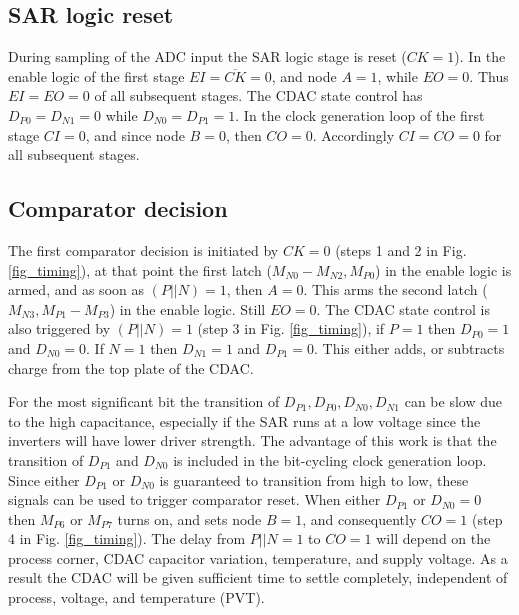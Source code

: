 \subsection{SAR logic reset}
During sampling of the ADC input the SAR logic stage is reset ($CK=1$). In the
enable logic of the first  stage $EI=\overline{CK}=0$, and node $A=1$,
while $EO=0$. Thus $EI=EO=0$ of all subsequent stages. The CDAC
state control has $D_{P0}=D_{N1}=0$ while $D_{N0}=D_{P1}=1$. In the clock generation
loop of the first stage $CI=0$, and since node $B=0$, then
$CO=0$. Accordingly $CI=CO=0$ for all subsequent stages.

\subsection{Comparator decision}
The first comparator decision is initiated by $CK=0$ (steps 1 and 2 in Fig. \ref{fig_timing}), at that point the
first latch ($M_{N0}-M_{N2}, M_{P0}$) in the enable logic is armed, and as soon as $(P||N)=1$,
then $A=0$. This arms the second latch ($M_{N3},M_{P1}-M_{P3}$) in the enable
logic. Still $EO=0$. 
The CDAC state control is also triggered by $(P||N)=1$ (step 3 in Fig. \ref{fig_timing}), if $P=1$ then $D_{P0}=1$
and $D_{N0}=0$. If $N=1$ then $D_{N1}=1$ and $D_{P1}=0$. This
either adds, or subtracts charge from the top plate of the
CDAC. 


For the most significant bit the transition of $D_{P1},D_{P0},D_{N0},D_{N1}$ can be slow due to the
high capacitance, especially if the SAR runs at
a low voltage since the inverters will have lower driver strength. 
The advantage of this work is that the transition of $D_{P1}$ and $D_{N0}$ is included in the bit-cycling
clock generation loop. Since either $D_{P1}$ or $D_{N0}$ is guaranteed to transition
from high to low, these signals can be used to trigger comparator
reset.  When either $D_{P1}$ or $D_{N0} = 0$ then $M_{P6}$ or $M_{P7}$ turns on, and sets
node $B=1$, and consequently $CO = 1$ (step 4 in Fig. \ref{fig_timing}). The delay from $P||N=1$ to
$CO=1$ will depend on the process corner, CDAC capacitor variation, temperature,  and supply voltage. As a result the CDAC will be given sufficient
time to settle completely, independent of process, voltage, and
temperature (PVT). 


